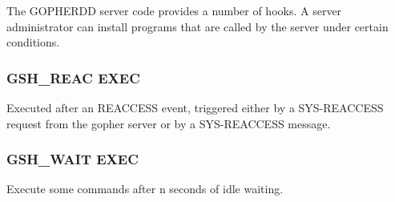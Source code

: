 The GOPHERDD server code provides a number of hooks.  A server
administrator can install programs that are called by the server
under certain conditions.

\subsubsection{GSH\_REAC EXEC}
Executed after an REACCESS event, triggered either by a
SYS-REACCESS request from the gopher server or by a SYS-REACCESS
message.

\subsubsection{GSH\_WAIT EXEC}
Execute some commands after n seconds of idle waiting.



